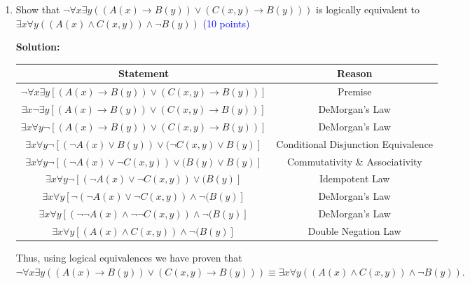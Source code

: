 \documentclass{article}
\newcommand{\pt}[1]{\textcolor{blue}{(#1 points)}}
\newenvironment{solution}
{
\par
\color{blue}
\textbf{Solution:}
}
{
\par
}
\begin{document}
\begin{enumerate}
\begin{enumerate}
    \end{enumerate}
    
    
    \item Show that $\neg \forall x \exists y ((A(x) \rightarrow B(y)) \lor (C(x, y) \rightarrow B(y)))$ is logically equivalent to $\exists x \forall y ((A(x) \land C(x, y)) \land \neg B(y))$ \pt{10}\\
    \begin{solution}
    \begin{tabular}{c|c}
        Statement & Reason \\
        \hline
        $\neg \forall x \exists y [(A(x) \rightarrow B(y)) \lor (C(x, y) \rightarrow B(y))]$ & Premise \\
        $\exists x \neg \exists y [(A(x) \rightarrow B(y)) \lor (C(x, y) \rightarrow B(y))]$ & DeMorgan's Law \\
        $\exists x \forall y \neg [(A(x) \rightarrow B(y)) \lor (C(x, y) \rightarrow B(y))] $ & DeMorgan's Law \\
        $\exists x \forall y \neg [(\neg A(x) \lor B(y)) \lor (\neg C(x, y) \lor B(y)]$ & Conditional Disjunction Equivalence \\
        $\exists x \forall y \neg [(\neg A(x) \lor \neg C(x,y)) \lor (B(y) \lor B(y)]$ & Commutativity \& Associativity \\
        $\exists x \forall y \neg [(\neg A(x) \lor \neg C(x,y)) \lor (B(y)]$ & Idempotent Law \\
        $\exists x \forall y [\neg (\neg A(x) \lor \neg C(x,y)) \land \neg (B(y)]$ & DeMorgan's Law \\
        $\exists x \forall y [(\neg \neg A(x) \land \neg \neg C(x,y)) \land \neg (B(y)]$ & DeMorgan's Law \\
        $\exists x \forall y [(A(x) \land C(x,y)) \land \neg (B(y)]$ & Double Negation Law \\
    \end{tabular}
    Thus, using logical equivalences we  have proven that $\neg \forall x \exists y ((A(x) \rightarrow B(y)) \lor (C(x, y) \rightarrow B(y))) \equiv \exists x \forall y ((A(x) \land C(x, y)) \land \neg B(y))$.
    \end{solution}
    

\end{enumerate}
\end{document}

